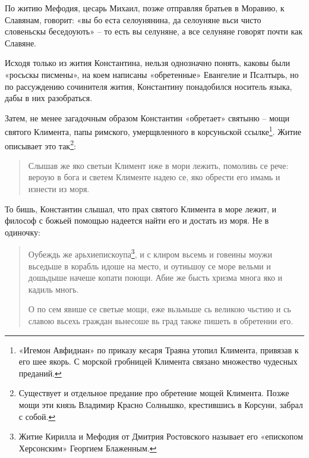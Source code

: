 По житию Мефодия, цесарь Михаил, позже отправляя братьев в Моравию, к Славянам, говорит: «вы бо еста селоунянина, да селоуняне вьси чисто словеньскы беседоують» – то есть вы селуняне, а все селуняне говорят почти как Славяне.

Исходя только из жития Константина, нельзя однозначно понять, каковы были «росьскы писмены», на коем написаны «обретенные» Евангелие и Псалтырь, но по рассуждению сочинителя жития, Константину понадобился носитель языка, дабы в них разобраться.


Затем, не менее загадочным образом Константин «обретает» святыню – мощи святого Климента, папы римского, умерщвленного в корсуньской ссылке\footnote{«Игемон Авфидиан» по приказу кесаря Траяна утопил Климента, привязав к его шее якорь. С морской гробницей Климента связано множество чудесных преданий.}. Житие описывает это так\footnote{Существует и отдельное предание про обретение мощей Климента. Позже мощи эти князь Владимир Красно Солнышко, крестившись в Корсуни, забрал с собой.}:

\begin{quotation}
Слышав же яко светыи Климент иже в мори лежить, помоливь се рече: вероую в бога и светем Клименте надею се, яко обрести его имамь и изнести из моря.
\end{quotation}

То бишь, Константин слышал, что прах святого Климента в море лежит, и философ с божьей помощью надеется найти его и достать из моря. Не в одиночку:

\begin{quotation}
Оубеждь же арьхиепискоупа\footnote{Житие Кирилла и Мефодия от Дмитрия Ростовского называет его «епископом Херсонским» Георгием Блаженным.}, и с клиром вьсемь и говеины моужи вьседьше в корабль идоше на место, и оутиьшоу се море вельми и дошьдыше начеше копати поющи. Абие же бысть хризма многа яко и кадиль многь.

О по сем явише се светые мощи, еже вьзьмьше сь великою чьстию и сь славою вьсехь граждан вьнесоше вь град также пишеть в обретении его.
\end{quotation}

